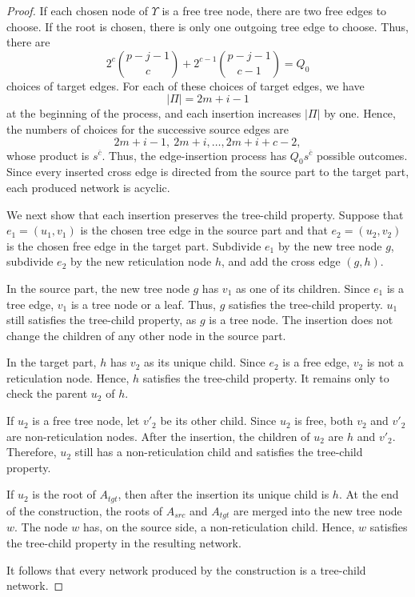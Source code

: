 \documentclass[11pt]{article}
\theoremstyle{definition}
\theoremstyle{remark}
\newcommand{\rise}[2]{#1^{\overline{#2}}}
\begin{document}
\begin{proof}
If each chosen node of $\Upsilon$ is a free tree node, there are two free edges to choose. If the root is chosen, there is only one outgoing tree edge to choose. Thus, there are   
\[
2^c\binom{p-j-1}{c}+2^{c-1}{p-j-1\choose c-1}=Q_0
\]
choices of target edges.
For each of these 
choices of target edges, we have
\[
|\Pi|=2m+i-1
\]
at the beginning of the process, and each insertion increases $|\Pi|$ by one.
Hence, the numbers of choices for the successive source edges are
\[
2m+i-1,\ 2m+i,\ldots,2m+i+c-2,
\]
whose product is $s^{\overline c}$.
Thus, the edge-insertion process has
$Q_0\rise{s}{c}$
possible outcomes. Since every inserted cross edge is directed from the
source part to the target part, each produced network is acyclic.

We next show that each insertion preserves the tree-child property.
Suppose that $e_1=(u_1,v_1)$ is the chosen tree edge in the source part
and that $e_2=(u_2,v_2)$ is the chosen free edge in the target part.
Subdivide $e_1$ by the new tree node $g$, subdivide $e_2$ by the new
reticulation node $h$, and add the cross edge $(g,h)$.

In the source part, the new tree node $g$ has $v_1$ as one of its
children. Since $e_1$ is a tree edge, $v_1$ is a tree node or a leaf.
Thus, $g$ satisfies the tree-child property. 
$u_1$ still satisfies the tree-child property, as $g$ is a tree node. The insertion does not
change the children of any other node in the source part.

In the target part, $h$ has $v_2$ as its unique child. Since $e_2$ is
a free edge, $v_2$ is not a reticulation node. Hence, $h$ satisfies the
tree-child property. It remains only to check the parent $u_2$ of $h$.

If $u_2$ is a free tree node, let $v'_2$ be its other child. Since
$u_2$ is free, both $v_2$ and $v'_2$ are non-reticulation nodes.
After the insertion, the children of $u_2$ are $h$ and $v'_2$.
Therefore, $u_2$ still has a non-reticulation child and satisfies the
tree-child property.

If $u_2$ is the root of $A_{tgt}$, then after the insertion its unique
child is $h$. At the end of the construction, the roots of $A_{src}$ and
$A_{tgt}$ are merged into the new tree node $w$. The node $w$ has, on the
source side, a non-reticulation child. Hence, $w$ satisfies the
tree-child property in the resulting network.

It follows that every network produced by the construction is a
tree-child network.


\end{proof}
\end{document}
